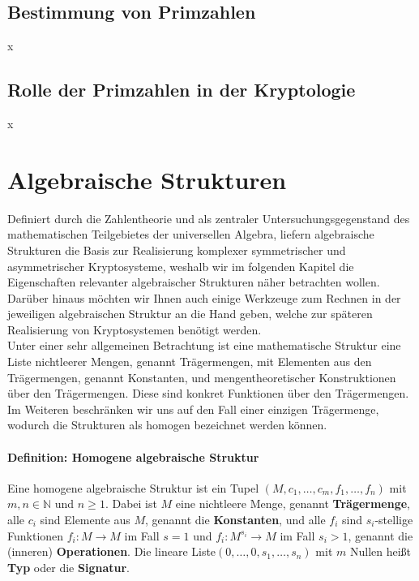 \subsection{Bestimmung von Primzahlen}
x

\subsection{Rolle der Primzahlen in der Kryptologie}
x

\section{Algebraische Strukturen}
Definiert durch die Zahlentheorie und als zentraler Untersuchungsgegenstand des mathematischen Teilgebietes der universellen Algebra, liefern algebraische Strukturen die Basis zur Realisierung komplexer symmetrischer und asymmetrischer Kryptosysteme, weshalb wir im folgenden Kapitel die Eigenschaften relevanter algebraischer Strukturen näher betrachten wollen. Darüber hinaus möchten wir Ihnen auch einige Werkzeuge zum Rechnen in der jeweiligen algebraischen Struktur an die Hand geben, welche zur späteren Realisierung von Kryptosystemen benötigt werden.\\

Unter einer sehr allgemeinen Betrachtung ist eine mathematische Struktur eine Liste nichtleerer Mengen, genannt Trägermengen, mit Elementen aus den Trägermengen, genannt Konstanten, und mengentheoretischer Konstruktionen über den Trägermengen. Diese sind konkret Funktionen über den Trägermengen.
Im Weiteren beschränken wir uns auf den Fall einer einzigen Trägermenge, wodurch die Strukturen als homogen bezeichnet werden können.
\paragraph{Definition: Homogene algebraische Struktur}
Eine homogene algebraische Struktur ist ein Tupel $(M,c_1,\dots,c_m,f_1,\dots,f_n)$ mit $m,n \in \mathbb{N}$ und $n \geq 1$. Dabei ist $M$ eine nichtleere Menge, genannt \textbf{Trägermenge}, alle $c_i$ sind Elemente aus $M$, genannt die \textbf{Konstanten}, und alle $f_i$ sind $s_i$-stellige Funktionen $f_i:M \rightarrow M$ im Fall $s = 1$ und $f_i:M^{s_i} \rightarrow M$ im Fall $s_i>1$, genannt die (inneren) \textbf{Operationen}. Die lineare Liste$(0,\dots,0,s_1,\dots,s_n)$ mit $m$ Nullen heißt \textbf{Typ} oder die \textbf{Signatur}.\newline

